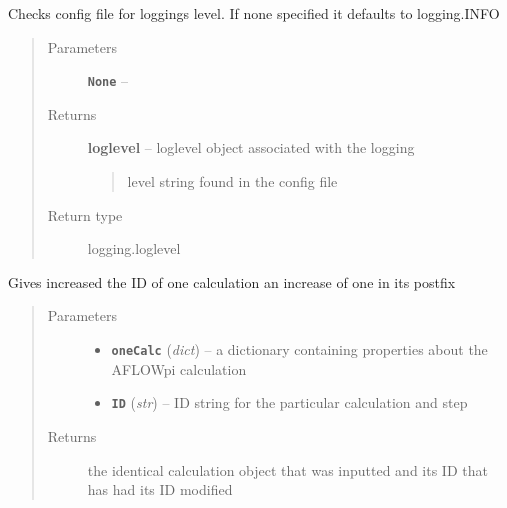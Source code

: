 \documentclass[letterpaper,10pt,english]{sphinxmanual}
\begin{document}

\begin{fulllineitems}
\label{prep:prep.__getLoglevel}
Checks config file for loggings level.
If none specified it defaults to logging.INFO
\begin{quote}\begin{description}
\item[{Parameters}] \leavevmode
\textbf{\texttt{None}} -- 

\item[{Returns}] \leavevmode

\textbf{loglevel} --
loglevel object associated with the logging
\begin{quote}

level string found in the config file
\end{quote}


\item[{Return type}] \leavevmode
logging.loglevel

\end{description}\end{quote}

\end{fulllineitems}


\begin{fulllineitems}
\label{prep:prep.__getNextOneCalcVarName}
Gives increased the ID of one calculation an increase of one in its postfix
\begin{quote}\begin{description}
\item[{Parameters}] \leavevmode\begin{itemize}
\item {} 
\textbf{\texttt{oneCalc}} (\emph{dict}) -- a dictionary containing properties about the AFLOWpi calculation

\item {} 
\textbf{\texttt{ID}} (\emph{str}) -- ID string for the particular calculation and step

\end{itemize}

\item[{Returns}] \leavevmode
the identical calculation object that was inputted and its ID that has had its ID modified

\end{description}\end{quote}

\end{fulllineitems}
\end{document}
